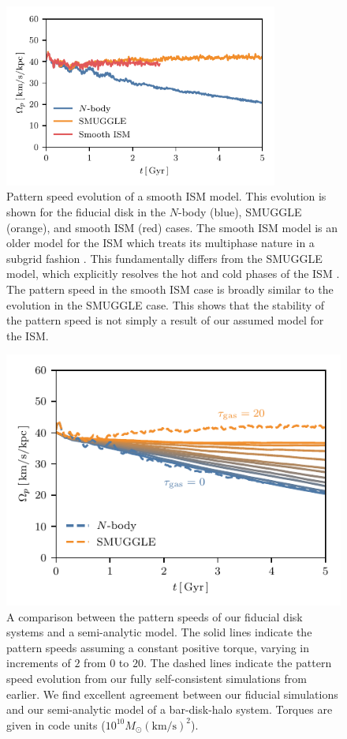 \documentclass[twocolumn,linenumbers,trackchanges]{aastex631}
\newcommand{\kms}{\ensuremath{\textrm{km}/\textrm{s}}}
\newcommand{\Nbody}{$N$-body}
\newcommand{\SMUGGLE}{SMUGGLE}
\newcommand{\Msun}{\ensuremath{M_{\odot}}}
\begin{document}
\begin{figure}
    \centering
    \includegraphics[width=9cm]{fig/ps_GFM.pdf}
    \caption{Pattern speed evolution of a smooth ISM model. This evolution is
    shown for the fiducial disk in the \Nbody{} (blue), \SMUGGLE{} (orange), and
    smooth ISM (red) cases. The smooth ISM model is an older model for the ISM
    which treats its multiphase nature in a subgrid fashion
    \citep{2003MNRAS.339..289S}. This fundamentally differs from the \SMUGGLE{}
    model, which explicitly resolves the hot and cold phases of the ISM
    \citep{2019MNRAS.489.4233M}. The pattern speed in the smooth ISM case is
    broadly similar to the evolution in the \SMUGGLE{} case. This shows that the
    stability of the pattern speed is not simply a result of our assumed model
    for the ISM.}
\label{fig:GFM}
\end{figure}

\begin{figure}
    \centering
    \includegraphics[width=\columnwidth]{fig/samGvar.pdf}
    \caption{A comparison between the pattern speeds of our fiducial disk
    systems and a semi-analytic model. The solid lines indicate the pattern
    speeds assuming a constant positive torque, varying in increments of $2$
    from $0$ to $20$. The dashed lines indicate the pattern speed evolution from
    our fully self-consistent simulations from earlier. We find excellent
    agreement between our fiducial simulations and our semi-analytic model of a
    bar-disk-halo system. Torques are given in code units ($10^{10}\Msun
    \left(\kms\right)^2$).}
    \label{fig:sam}
\end{figure}
\end{document}
